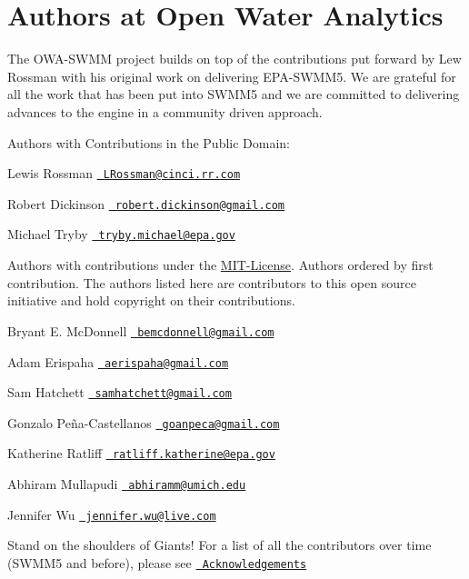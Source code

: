 \hypertarget{group___a_u_t_h_o_r_s}{}\section{Authors at Open Water Analytics}
\label{group___a_u_t_h_o_r_s}
The O\+W\+A-\/\+S\+W\+MM project builds on top of the contributions put forward by Lew Rossman with his original work on delivering E\+P\+A-\/\+S\+W\+M\+M5. We are grateful for all the work that has been put into S\+W\+M\+M5 and we are committed to delivering advances to the engine in a community driven approach.

Authors with Contributions in the Public Domain\+:


\begin{DoxyItemize}
\item Lewis Rossman \href{mailto:LRossman@cinci.rr.com}{\texttt{ L\+Rossman@cinci.\+rr.\+com}}
\item Robert Dickinson \href{mailto:robert.dickinson@gmail.com}{\texttt{ robert.\+dickinson@gmail.\+com}}
\item Michael Tryby \href{mailto:tryby.michael@epa.gov}{\texttt{ tryby.\+michael@epa.\+gov}}
\end{DoxyItemize}

Authors with contributions under the \mbox{\hyperlink{group___m_i_t-_license}{M\+I\+T-\/\+License}}. Authors ordered by first contribution. The authors listed here are contributors to this open source initiative and hold copyright on their contributions.


\begin{DoxyItemize}
\item Bryant E. Mc\+Donnell \href{mailto:bemcdonnell@gmail.com}{\texttt{ bemcdonnell@gmail.\+com}}
\item Adam Erispaha \href{mailto:aerispaha@gmail.com}{\texttt{ aerispaha@gmail.\+com}}
\item Sam Hatchett \href{mailto:samhatchett@gmail.com}{\texttt{ samhatchett@gmail.\+com}}
\item Gonzalo Peña-\/\+Castellanos \href{mailto:goanpeca@gmail.com}{\texttt{ goanpeca@gmail.\+com}}
\item Katherine Ratliff \href{mailto:ratliff.katherine@epa.gov}{\texttt{ ratliff.\+katherine@epa.\+gov}}
\item Abhiram Mullapudi \href{mailto:abhiramm@umich.edu}{\texttt{ abhiramm@umich.\+edu}}
\item Jennifer Wu \href{mailto:jennifer.wu@live.com}{\texttt{ jennifer.\+wu@live.\+com}}
\end{DoxyItemize}

Stand on the shoulders of Giants! For a list of all the contributors over time (S\+W\+M\+M5 and before), please see \href{https://github.com/OpenWaterAnalytics/Stormwater-Management-Model/wiki/Acknowledgements}{\texttt{ Acknowledgements}} 